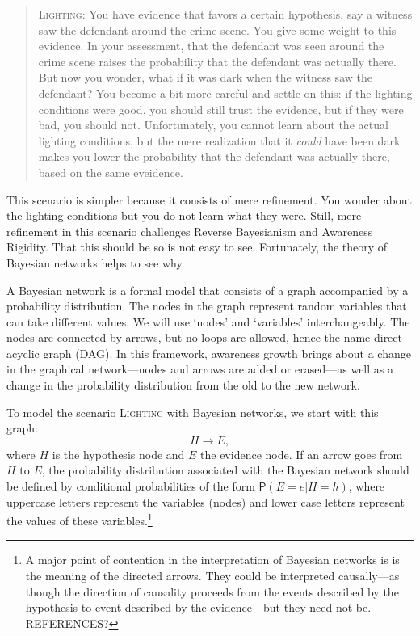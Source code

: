 \documentclass[
  11pt,
  dvipsnames,enabledeprecatedfontcommands]{scrartcl}
\newcommand{\pr}[1]{\ensuremath{\mathsf{P}(#1)}}
\begin{document}
\begin{quote}
\textsc{Lighting:} You have evidence that favors a certain hypothesis,
say a witness saw the defendant around the crime scene. You give some
weight to this evidence. In your assessment, that the defendant was seen
around the crime scene raises the probability that the defendant was
actually there. But now you wonder, what if it was dark when the witness
saw the defendant? You become a bit more careful and settle on this: if
the lighting conditions were good, you should still trust the evidence,
but if they were bad, you should not. Unfortunately, you cannot learn
about the actual lighting conditions, but the mere realization that it
\textit{could} have been dark makes you lower the probability that the
defendant was actually there, based on the same eveidence.
\end{quote}

\noindent This scenario is simpler because it consists of mere
refinement. You wonder about the lighting conditions but you do not
learn what they were. Still, mere refinement in this scenario challenges
Reverse Bayesianism and Awareness Rigidity. That this should be so is
not easy to see. Fortunately, the theory of Bayesian networks helps to
see why.

A Bayesian network is a formal model that consists of a graph
accompanied by a probability distribution. The nodes in the graph
represent random variables that can take different values. We will use
`nodes' and `variables' interchangeably. The nodes are connected by
arrows, but no loops are allowed, hence the name direct acyclic graph
(DAG). In this framework, awareness growth brings about a change in the
graphical network---nodes and arrows are added or erased---as well as a
change in the probability distribution from the old to the new network.

To model the scenario \textsc{Lighting} with Bayesian networks, we start
with this graph: \[H \rightarrow E,\] where \(H\) is the hypothesis node
and \(E\) the evidence node. If an arrow goes from \(H\) to \(E\), the
probability distribution associated with the Bayesian network should be
defined by conditional probabilities of the form \(\pr{E=e \vert H=h}\),
where uppercase letters represent the variables (nodes) and lower case
letters represent the values of these variables.\footnote{A major point
  of contention in the interpretation of Bayesian networks is is the
  meaning of the directed arrows. They could be interpreted
  causally---as though the direction of causality proceeds from the
  events described by the hypothesis to event described by the
  evidence---but they need not be. REFERENCES?}
\end{document}
